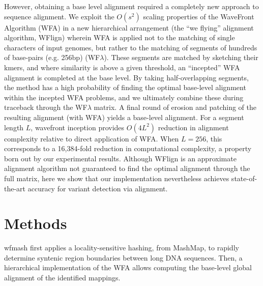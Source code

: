 \documentclass{bioinfo}
\theoremstyle{definition}
\begin{document}
However, obtaining a base level alignment required a completely new approach to sequence alignment.
We exploit the $O(s^2)$ scaling properties of the WaveFront Algorithm (WFA) \citep{Marco_Sola_2020} in a new hierarchical arrangement (the ``we flying'' alignment algorithm, WFlign) wherein WFA is applied not to the matching of single characters of input genomes, but rather to the matching of segments of hundreds of base-pairs (e.g. 256bp) (WF$\lambda$).
These segments are matched by sketching their kmers, and where similarity is above a given threshold, an ``incepted'' WFA alignment is completed at the base level.
By taking half-overlapping segments, the method has a high probability of finding the optimal base-level alignment within the incepted WFA problems, and we ultimately combine these during traceback through the WF$\lambda$ matrix.
A final round of erosion and patching of the resulting alignment (with WFA) yields a base-level alignment.
For a segment length $L$, wavefront inception provides $O(4L^2)$ reduction in alignment complexity relative to direct application of WFA.
When $L=256$, this corresponds to a 16,384-fold reduction in computational complexity, a property born out by our experimental results.
Although WFlign is an approximate alignment algorithm not guaranteed to find the optimal alignment through the full matrix, here we show that our implementation nevertheless achieves state-of-the-art accuracy for variant detection via alignment.

%




\section{Methods}
\label{sec:methods}

wfmash first applies a locality-sensitive hashing, from MashMap, to rapidly determine syntenic region boundaries between long DNA sequences.
Then, a hierarchical implementation of the WFA allows computing the base-level global alignment of the identified mappings.
\end{document}
